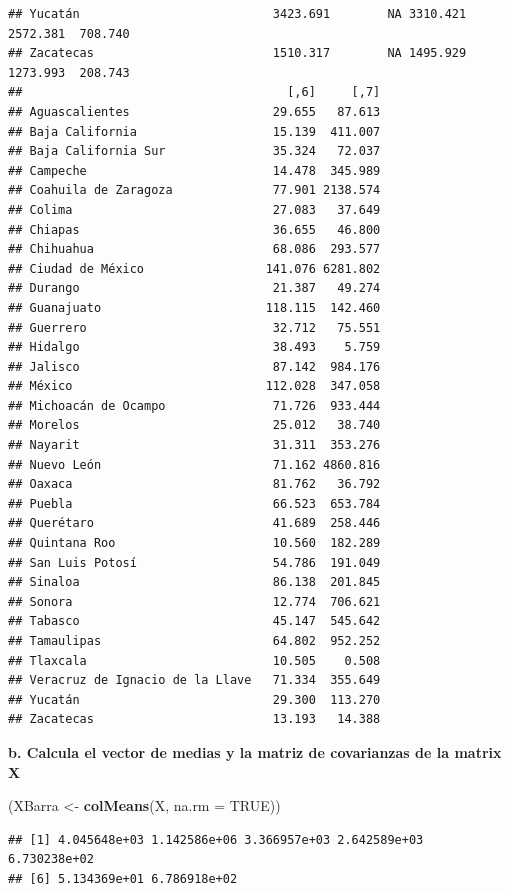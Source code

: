 \documentclass[
]{article}
\newenvironment{Shaded}{\begin{snugshade}}{\end{snugshade}}
\newcommand{\DataTypeTok}[1]{\textcolor[rgb]{0.13,0.29,0.53}{#1}}
\newcommand{\KeywordTok}[1]{\textcolor[rgb]{0.13,0.29,0.53}{\textbf{#1}}}
\newcommand{\NormalTok}[1]{#1}
\newcommand{\OtherTok}[1]{\textcolor[rgb]{0.56,0.35,0.01}{#1}}
\newcommand{\StringTok}[1]{\textcolor[rgb]{0.31,0.60,0.02}{#1}}
\begin{document}
\begin{verbatim}
## Yucatán                           3423.691        NA 3310.421 2572.381  708.740
## Zacatecas                         1510.317        NA 1495.929 1273.993  208.743
##                                     [,6]     [,7]
## Aguascalientes                    29.655   87.613
## Baja California                   15.139  411.007
## Baja California Sur               35.324   72.037
## Campeche                          14.478  345.989
## Coahuila de Zaragoza              77.901 2138.574
## Colima                            27.083   37.649
## Chiapas                           36.655   46.800
## Chihuahua                         68.086  293.577
## Ciudad de México                 141.076 6281.802
## Durango                           21.387   49.274
## Guanajuato                       118.115  142.460
## Guerrero                          32.712   75.551
## Hidalgo                           38.493    5.759
## Jalisco                           87.142  984.176
## México                           112.028  347.058
## Michoacán de Ocampo               71.726  933.444
## Morelos                           25.012   38.740
## Nayarit                           31.311  353.276
## Nuevo León                        71.162 4860.816
## Oaxaca                            81.762   36.792
## Puebla                            66.523  653.784
## Querétaro                         41.689  258.446
## Quintana Roo                      10.560  182.289
## San Luis Potosí                   54.786  191.049
## Sinaloa                           86.138  201.845
## Sonora                            12.774  706.621
## Tabasco                           45.147  545.642
## Tamaulipas                        64.802  952.252
## Tlaxcala                          10.505    0.508
## Veracruz de Ignacio de la Llave   71.334  355.649
## Yucatán                           29.300  113.270
## Zacatecas                         13.193   14.388
\end{verbatim}

\textbf{b. Calcula el vector de medias y la matriz de covarianzas de la
matrix X}

\begin{Shaded}
\begin{Highlighting}[]
\NormalTok{(XBarra <-}\StringTok{ }\KeywordTok{colMeans}\NormalTok{(X, }\DataTypeTok{na.rm =} \OtherTok{TRUE}\NormalTok{))}
\end{Highlighting}
\end{Shaded}

\begin{verbatim}
## [1] 4.045648e+03 1.142586e+06 3.366957e+03 2.642589e+03 6.730238e+02
## [6] 5.134369e+01 6.786918e+02
\end{verbatim}
\end{document}
